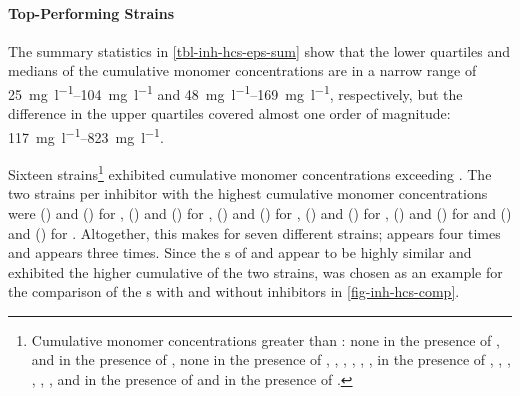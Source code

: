 \paragraph{Top-Performing Strains}
The summary statistics in \vref{tbl-inh-hcs-eps-sum} show that the lower quartiles and medians of the cumulative monomer concentrations are in a narrow range of \SIrange{25}{104}{\milli\gram\per\litre} and \SIrange{48}{169}{\milli\gram\per\litre}, respectively, but the difference in the upper quartiles covered almost one order of magnitude: \SIrange{117}{823}{\milli\gram\per\litre}.

\label{intext-lch-eps-inh-hcs-top-strains}Sixteen strains\footnote{Cumulative monomer concentrations greater than : none in the presence of \fur{},
 and  in the presence of \hmf{},
none in the presence of \van{},
, , , , ,  in the presence of \acet{},
, , , , ,  and  in the presence of \fora{} and
 in the presence of \laev{}.} %
exhibited cumulative monomer concentrations exceeding . The two strains per inhibitor with the highest cumulative monomer concentrations were  () and  () for \fur{},  () and  () for \hmf{},  () and  () for \van{},  () and  () for \acet{},  () and  () for \fora{} and  () and  () for \laev{}. Altogether, this makes for seven different strains;  appears four times and  appears three times. Since the \eps{} \amc{}s of  and  appear to be highly similar and  exhibited the higher cumulative \amc{} of the two strains,  was chosen as an example for the comparison of the \eps{} \amc{}s with and without inhibitors in \vref{fig-inh-hcs-comp}.

